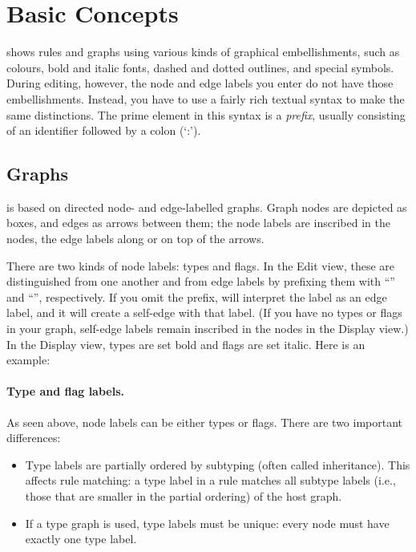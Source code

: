 \section{Basic Concepts}

\GROOVE shows rules and graphs using various kinds of graphical embellishments,
such as colours, bold and italic fonts, dashed and dotted outlines, and special
symbols. During editing, however, the node and edge labels you enter do not
have those embellishments. Instead, you have to use a fairly rich textual
syntax to make the same distinctions. The prime element in this syntax is a
\emph{prefix}, usually consisting of an identifier followed by a colon (`:').



\subsection{Graphs}

\GROOVE is based on directed node- and edge-labelled graphs. Graph nodes are
depicted as boxes, and edges as arrows between them; the node labels are
inscribed in the nodes, the edge labels along or on top of the arrows.

There are two kinds of node labels: types and flags. In the Edit view, these
are distinguished from one another and from edge labels by prefixing them with
``\typeP'' and ``\flagP'', respectively. If you omit the prefix, \GROOVE will
interpret the label as an edge label, and it will create a self-edge with that
label. (If you have no types or flags in your graph, self-edge labels remain
inscribed in the nodes in the Display view.) In the Display view, types are set
bold and flags are set italic. Here is an example:


\paragraph{Type and flag labels.}

As seen above, node labels can be either types or flags. There are two
important differences:
\begin{itemize}\noitemsep
\item Type labels are partially ordered by subtyping (often called
  inheritance). This affects rule matching: a type label in a rule matches all
  subtype labels (i.e., those that are smaller in the partial ordering) of the
  host graph.
\item If a type graph is used, type labels must be unique: every node must have
  exactly one type label.
\end{itemize}

